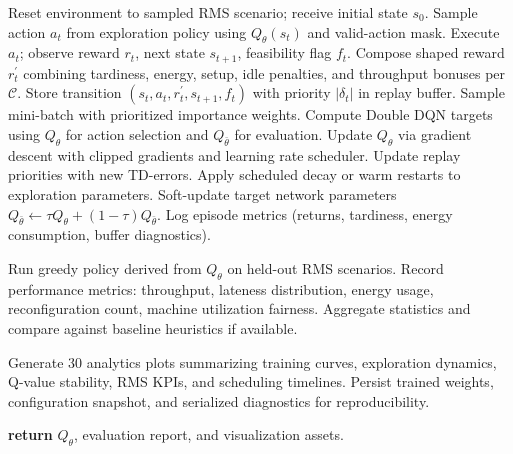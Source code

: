 \documentclass{article}
\begin{document}
\begin{algorithm}
\begin{algorithmic}[1]
\Statex
{}
        \State Reset environment to sampled RMS scenario; receive initial state $s_0$.
            \State Sample action $a_t$ from exploration policy using $Q_{\theta}(s_t)$ and valid-action mask.
            \State Execute $a_t$; observe reward $r_t$, next state $s_{t+1}$, feasibility flag $f_t$.
            \State Compose shaped reward $r_t^{\prime}$ combining tardiness, energy, setup, idle penalties, and throughput bonuses per $\mathcal{C}$.
            \State Store transition $(s_t, a_t, r_t^{\prime}, s_{t+1}, f_t)$ with priority $|\delta_t|$ in replay buffer.
                \State Sample mini-batch with prioritized importance weights.
                \State Compute Double DQN targets using $Q_{\theta}$ for action selection and $Q_{\bar{\theta}}$ for evaluation.
                \State Update $Q_{\theta}$ via gradient descent with clipped gradients and learning rate scheduler.
                \State Update replay priorities with new TD-errors.
            \EndIf
            \State Apply scheduled decay or warm restarts to exploration parameters.
        \EndFor
        \State Soft-update target network parameters $Q_{\bar{\theta}} \leftarrow \tau Q_{\theta} + (1-\tau) Q_{\bar{\theta}}$.
        \State Log episode metrics (returns, tardiness, energy consumption, buffer diagnostics).
    \EndFor
\EndProcedure

\Statex
{}
        \State Run greedy policy derived from $Q_{\theta}$ on held-out RMS scenarios.
        \State Record performance metrics: throughput, lateness distribution, energy usage, reconfiguration count, machine utilization fairness.
    \EndFor
    \State Aggregate statistics and compare against baseline heuristics if available.
\EndProcedure

\Statex
{}
    \State Generate 30 analytics plots summarizing training curves, exploration dynamics, Q-value stability, RMS KPIs, and scheduling timelines.
    \State Persist trained weights, configuration snapshot, and serialized diagnostics for reproducibility.
\EndProcedure

\Statex
\State \textbf{return} $Q_{\theta}$, evaluation report, and visualization assets.
\end{algorithmic}
\end{algorithm}
\end{document}
